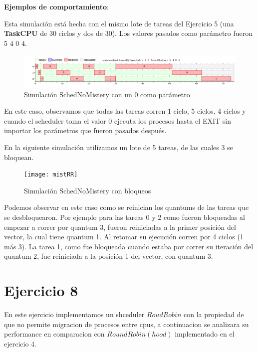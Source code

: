 \documentclass[11pt]{article}
\begin{document}
\begin{enumerate}
  \vspace{1mm}
  \textbf{Ejemplos de comportamiento}:
  \vspace{1mm}

  Esta simulación está hecha con el mismo lote de tareas del Ejercicio 5 (una \textbf{TaskCPU} de 30 ciclos y dos de 30). 
  Los valores pasados como parámetro fueron $5$ $4$ $0$ $4$.


        \begin{figure}[H]
          \includegraphics[scale=0.5]{Ej7Ej1}
          \caption{Simulación SchedNoMistery con un 0 como parámetro} 
        \end{figure}

  En este caso, observamos que todas las tareas corren 1 ciclo, 5 ciclos, 4 ciclos y cuando el scheduler toma el valor 0 ejecuta los procesos hasta el EXIT sin importar los parámetros que fueron pasados después.  

  En la siguiente simulación utilizamos un lote de 5 tareas, de las cuales 3 se bloquean.


        \begin{figure}[H]
          \texttt{[image: mistRR]}
          \caption{Simulación SchedNoMistery con bloqueos} 
        \end{figure}

  Podemos observar en este caso como se reinician los quantums de las tareas que se desbloquearon. Por ejemplo para las tareas 0 y 2 como fueron 
  bloqueadas al empezar a correr por quantum 3, fueron reiniciadas a la primer posición del vector, la cual tiene quantum 1. Al retomar su ejecución 
  corren por 4 ciclos (1 más 3). La tarea 1, como fue bloqueada cuando estaba por correr su iteración del quantum 2, fue reiniciada a la posición 
  1 del vector, con quantum 3.

  \newpage

  \section{Ejercicio 8}
  En este ejercicio implementamos un shceduler $Roud Robin$ con la propiedad de que no permite migracion de procesos entre cpus, a continuacion se analizara su performance en comparacion con $Round Robin(hood)$ implementado en el ejercicio 4. \\


\end{enumerate}
\end{document}
